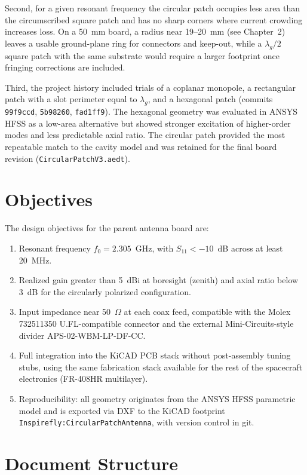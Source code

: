 Second, for a given resonant frequency the circular patch occupies less area than the circumscribed square patch and has no sharp corners where current crowding increases loss. On a 50~mm board, a radius near 19--20~mm (see Chapter~2) leaves a usable ground-plane ring for connectors and keep-out, while a $ \lambda_g/2 $ square patch with the same substrate would require a larger footprint once fringing corrections are included.

Third, the project history included trials of a coplanar monopole, a rectangular patch with a slot perimeter equal to $\lambda_g$, and a hexagonal patch (commits \texttt{99f9ccd}, \texttt{5b98260}, \texttt{fad1ff9}). The hexagonal geometry was evaluated in ANSYS HFSS as a low-area alternative but showed stronger excitation of higher-order modes and less predictable axial ratio. The circular patch provided the most repeatable match to the cavity model and was retained for the final board revision (\texttt{CircularPatchV3.aedt}).

\section{Objectives}

The design objectives for the parent antenna board are:

\begin{enumerate}[noitemsep]
    \item Resonant frequency $f_0 = 2.305$~GHz, with $S_{11} < -10$~dB across at least 20~MHz.
    \item Realized gain greater than 5~dBi at boresight (zenith) and axial ratio below 3~dB for the circularly polarized configuration.
    \item Input impedance near 50~$\Omega$ at each coax feed, compatible with the Molex 732511350 U.FL-compatible connector and the external Mini-Circuits-style divider APS-02-WBM-LP-DF-CC.
    \item Full integration into the KiCAD PCB stack without post-assembly tuning stubs, using the same fabrication stack available for the rest of the spacecraft electronics (FR-408HR multilayer).
    \item Reproducibility: all geometry originates from the ANSYS HFSS parametric model and is exported via DXF to the KiCAD footprint \texttt{Inspirefly:CircularPatchAntenna}, with version control in git.
\end{enumerate}

\section{Document Structure}

